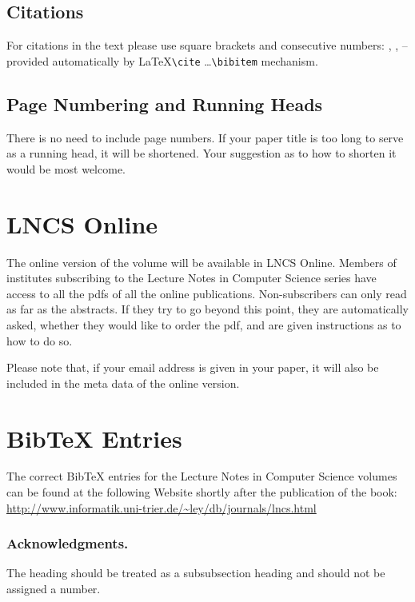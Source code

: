 \documentclass[runningheads,a4paper]{llncs}
\begin{document}
\subsection{Citations}

For citations in the text please use
square brackets and consecutive numbers: \cite{jour}, \cite{lncschap},
\cite{proceeding1} -- provided automatically
by \LaTeX \verb|\cite| \dots\verb|\bibitem| mechanism.

\subsection{Page Numbering and Running Heads}

There is no need to include page numbers. If your paper title is too
long to serve as a running head, it will be shortened. Your suggestion
as to how to shorten it would be most welcome.

\section{LNCS Online}

The online version of the volume will be available in LNCS Online.
Members of institutes subscribing to the Lecture Notes in Computer
Science series have access to all the pdfs of all the online
publications. Non-subscribers can only read as far as the abstracts. If
they try to go beyond this point, they are automatically asked, whether
they would like to order the pdf, and are given instructions as to how
to do so.

Please note that, if your email address is given in your paper,
it will also be included in the meta data of the online version.

\section{BibTeX Entries}

The correct BibTeX entries for the Lecture Notes in Computer Science
volumes can be found at the following Website shortly after the
publication of the book:
\url{http://www.informatik.uni-trier.de/~ley/db/journals/lncs.html}

\subsubsection*{Acknowledgments.} The heading should be treated as a
subsubsection heading and should not be assigned a number.
\end{document}
